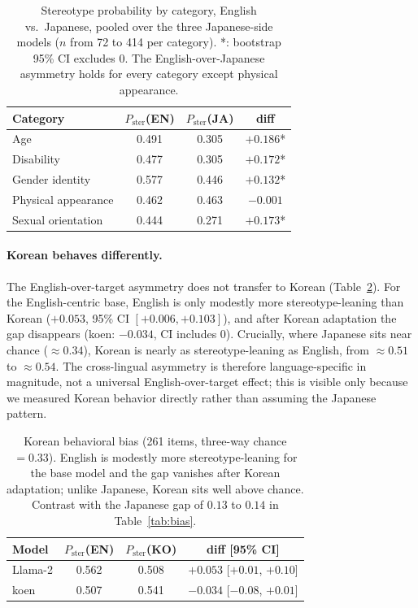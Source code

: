 \documentclass[11pt]{article}
\begin{document}
\begin{table}[t]
\centering\small
\begin{tabular}{lccc}
\toprule
\textbf{Category} & $P_{\text{ster}}$(EN) & $P_{\text{ster}}$(JA) & \textbf{diff} \\
\midrule
Age & 0.491 & 0.305 & $+0.186$* \\
Disability & 0.477 & 0.305 & $+0.172$* \\
Gender identity & 0.577 & 0.446 & $+0.132$* \\
Physical appearance & 0.462 & 0.463 & $-0.001$\phantom{*} \\
Sexual orientation & 0.444 & 0.271 & $+0.173$* \\
\bottomrule
\end{tabular}
\caption{Stereotype probability by category, English vs.\ Japanese, pooled over the three Japanese-side models ($n$ from 72 to 414 per category). *: bootstrap 95\% CI excludes 0. The English-over-Japanese asymmetry holds for every category except physical appearance.}
\label{tab:category}
\end{table}

\paragraph{Korean behaves differently.} The English-over-target asymmetry does not transfer to Korean (Table~\ref{tab:ko_bias}). For the English-centric base, English is only modestly more stereotype-leaning than Korean ($+0.053$, 95\% CI $[+0.006, +0.103]$), and after Korean adaptation the gap disappears (koen: $-0.034$, CI includes 0). Crucially, where Japanese sits near chance ($\approx0.34$), Korean is nearly as stereotype-leaning as English, from $\approx0.51$ to $\approx0.54$. The cross-lingual asymmetry is therefore language-specific in magnitude, not a universal English-over-target effect; this is visible only because we measured Korean behavior directly rather than assuming the Japanese pattern.

\begin{table}[t]
\centering\scriptsize
\setlength{\tabcolsep}{2.8pt}
\begin{tabular}{@{}lccc@{}}
\toprule
\textbf{Model} & $P_{\text{ster}}$(EN) & $P_{\text{ster}}$(KO) & \textbf{diff [95\% CI]} \\
\midrule
Llama-2 & 0.562 & 0.508 & $+0.053$ [$+0.01$, $+0.10$] \\
koen & 0.507 & 0.541 & $-0.034$ [$-0.08$, $+0.01$] \\
\bottomrule
\end{tabular}
\caption{Korean behavioral bias (261 items, three-way chance $=0.33$). English is modestly more stereotype-leaning for the base model and the gap vanishes after Korean adaptation; unlike Japanese, Korean sits well above chance. Contrast with the Japanese gap of $0.13$ to $0.14$ in Table~\ref{tab:bias}.}
\label{tab:ko_bias}
\end{table}
\end{document}
